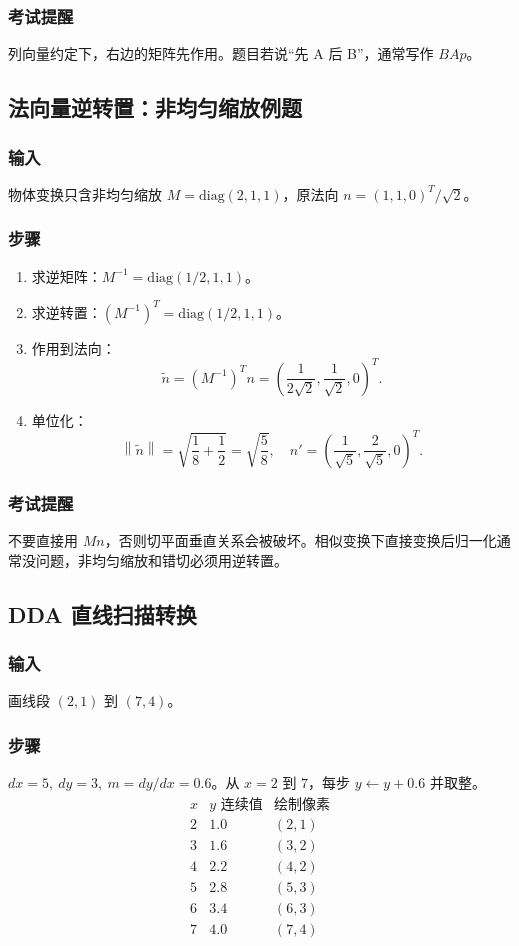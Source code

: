 \documentclass[UTF8,fontset=fandol,11pt]{ctexart}
\newcommand{\norm}[1]{\left\lVert #1 \right\rVert}
\begin{document}
\subsubsection*{考试提醒}
列向量约定下，右边的矩阵先作用。题目若说“先 A 后 B”，通常写作 $BAp$。

\subsection{法向量逆转置：非均匀缩放例题}
\subsubsection*{输入}
物体变换只含非均匀缩放 $M=\mathrm{diag}(2,1,1)$，原法向 $n=(1,1,0)^T/\sqrt2$。
\subsubsection*{步骤}
\begin{enumerate}
  \item 求逆矩阵：$M^{-1}=\mathrm{diag}(1/2,1,1)$。
  \item 求逆转置：$(M^{-1})^T=\mathrm{diag}(1/2,1,1)$。
  \item 作用到法向：
  \[
    \tilde n=(M^{-1})^Tn=\left(\frac{1}{2\sqrt2},\frac{1}{\sqrt2},0\right)^T.
  \]
  \item 单位化：
  \[
    \norm{\tilde n}=\sqrt{\frac18+\frac12}=\sqrt{\frac58},\quad
    n'=\left(\frac{1}{\sqrt5},\frac{2}{\sqrt5},0\right)^T.
  \]
\end{enumerate}
\subsubsection*{考试提醒}
不要直接用 $Mn$，否则切平面垂直关系会被破坏。相似变换下直接变换后归一化通常没问题，非均匀缩放和错切必须用逆转置。

\subsection{DDA 直线扫描转换}
\subsubsection*{输入}
画线段 $(2,1)$ 到 $(7,4)$。
\subsubsection*{步骤}
$dx=5,\ dy=3,\ m=dy/dx=0.6$。从 $x=2$ 到 $7$，每步 $y\leftarrow y+0.6$ 并取整。
\[
\begin{array}{c|c|c}
x & y\text{ 连续值} & \text{绘制像素}\\
\hline
2&1.0&(2,1)\\
3&1.6&(3,2)\\
4&2.2&(4,2)\\
5&2.8&(5,3)\\
6&3.4&(6,3)\\
7&4.0&(7,4)
\end{array}
\]
\end{document}
